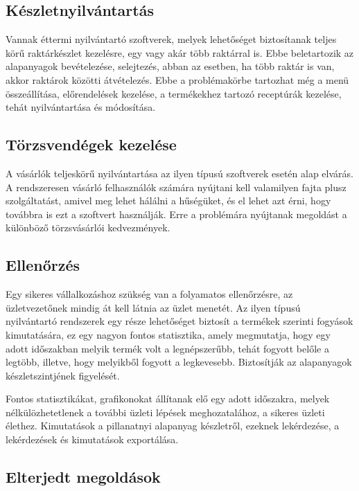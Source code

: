 \subsection{Készletnyilvántartás}

Vannak éttermi nyilvántartó szoftverek, melyek lehetőséget biztosítanak teljes körű raktárkészlet kezelésre, egy vagy akár több raktárral is. Ebbe beletartozik az alapanyagok bevételezése, selejtezés, abban az esetben, ha több raktár is van, akkor raktárok közötti átvételezés.
Ebbe a problémakörbe tartozhat még a menü összeállítása, előrendelések kezelése, a termékekhez tartozó receptúrák kezelése, tehát nyilvántartása és módosítása.

\subsection{Törzsvendégek kezelése}

A vásárlók teljeskörű nyilvántartása az ilyen típusú szoftverek esetén alap elvárás. A rendszeresen vásárló felhasználók számára nyújtani kell valamilyen fajta plusz szolgáltatást, amivel meg lehet hálálni a hűségüket, és el lehet azt érni, hogy továbbra is ezt a szoftvert használják. Erre a problémára nyújtanak megoldást a különböző törzsvásárlói kedvezmények.

\subsection{Ellenőrzés}

Egy sikeres vállalkozáshoz szükség van a folyamatos ellenőrzésre, az üzletvezetőnek mindig át kell látnia az üzlet menetét. Az ilyen típusú nyilvántartó rendszerek egy része lehetőséget biztosít a termékek szerinti fogyások kimutatására, ez egy nagyon fontos statisztika, amely megmutatja, hogy egy adott időszakban melyik termék volt a legnépszerűbb, tehát fogyott belőle a legtöbb, illetve, hogy melyikből fogyott a legkevesebb. Biztosítják az alapanyagok készletszintjének figyelését.

Fontos statisztikákat, grafikonokat állítanak elő egy adott időszakra, melyek nélkülözhetetlenek a további üzleti lépések meghozatalához, a sikeres üzleti élethez. Kimutatások a pillanatnyi alapanyag készletről, ezeknek lekérdezése, a lekérdezések és kimutatások exportálása.

\subsection{Elterjedt megoldások}

